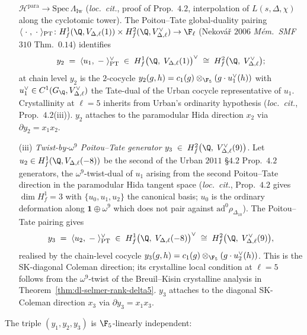 \begin{theorem}
\begin{enumerate}
 $\mathcal H^{\mathrm{para}}\to\mathrm{Spec}\,\Lambda_{\mathrm{Iw}}$
 (\emph{loc.\ cit.}, proof of Prop.~$4.2$, interpolation of
 $L(s,\Delta,\chi)$ along the cyclotomic tower). The Poitou--Tate
 global-duality pairing
 $\langle\;\cdot\;,\;\cdot\;\rangle_{\mathrm{PT}}
 \colon H^1_f(\Q,V_{\Delta,\ell}(1))
 \times H^2_f(\Q,V_{\Delta,\ell}^\vee)\to\F_\ell$
 (Nekov\'a\v{r} $2006$ \emph{M\'em.~SMF}~$310$ Thm.~$0.14$) identifies
 \begin{equation}
 \label{eq:y2-PT-dual}
 y_2 \;=\; \langle u_1,\;-\;\rangle_{\mathrm{PT}}^\vee
 \;\in\; H^1_f\bigl(\Q,\;V_{\Delta,\ell}(1)\bigr)^\vee
 \;\cong\; H^2_f\bigl(\Q,\;V_{\Delta,\ell}^\vee\bigr);
 \end{equation}
 at chain level $y_2$ is the $2$-cocycle
 $y_2(g,h) = c_1(g)\otimes_{\F_5} (g\cdot u_1^\vee(h))$
 with $u_1^\vee\in C^1(G_\Q,V_{\Delta,\ell}^\vee)$ the Tate-dual of the
 Urban cocycle representative of $u_1$. Crystallinity at $\ell = 5$
 inherits from Urban's ordinarity hypothesis (\emph{loc.\ cit.},
 Prop.~$4.2$(iii)). $y_2$ attaches to the paramodular Hida direction
 $x_2$ via $\partial y_2 = x_1 x_2$.
\item[(iii)] \emph{Twist-by-$\omega^9$ Poitou--Tate generator}
 $y_3 \;\in\; H^2_f\bigl(\Q,\;V_{\Delta,\ell}^\vee(9)\bigr)$.
 Let $u_2\in H^1_f(\Q, V_{\Delta,\ell}(-8))$ be the second of the
 Urban $2011$ \S $4.2$ Prop.~$4.2$ generators, the
 $\omega^9$-twist-dual of $u_1$ arising from the second
 Poitou--Tate direction in the paramodular Hida tangent space
 (\emph{loc.\ cit.}, Prop.~$4.2$ gives $\dim H^1_f = 3$ with
 $\{u_0, u_1, u_2\}$ the canonical basis; $u_0$ is the ordinary
 deformation along $\mathbf 1\oplus\omega^9$ which does not pair
 against $\mathrm{ad}^0\rho_{\Delta_{10}}$). The
 Poitou--Tate pairing gives
 \begin{equation}
 \label{eq:y3-PT-dual}
 y_3 \;=\; \langle u_2,\;-\;\rangle_{\mathrm{PT}}^\vee
 \;\in\; H^1_f\bigl(\Q,\;V_{\Delta,\ell}(-8)\bigr)^\vee
 \;\cong\; H^2_f\bigl(\Q,\;V_{\Delta,\ell}^\vee(9)\bigr),
 \end{equation}
realised by the chain-level cocycle
$y_3(g,h) = c_1(g)\otimes_{\F_5}(g\cdot u_2^\vee(h))$. This is the
SK-diagonal Coleman direction; its crystalline local condition at
 $\ell = 5$ follows from the $\omega^9$-twist of the
 Breuil--Kisin crystalline analysis in
 Theorem~\ref{thm:dl-selmer-rank-delta5}. $y_3$ attaches
 to the diagonal SK-Coleman direction $x_3$ via
 $\partial y_3 = x_1 x_3$.
\end{enumerate}
The triple $(y_1, y_2, y_3)$ is $\F_5$-linearly independent:

\end{theorem}
